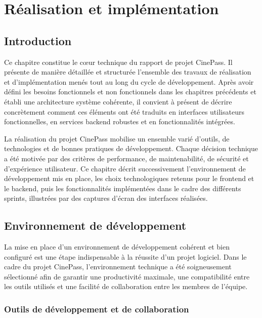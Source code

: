 \documentclass[12pt]{report}
\begin{document}
\chapter{Réalisation et implémentation}

\section{Introduction}

Ce chapitre constitue le cœur technique du rapport de projet CinePass. Il présente de manière détaillée et structurée l'ensemble des travaux de réalisation et d'implémentation menés tout au long du cycle de développement. Après avoir défini les besoins fonctionnels et non fonctionnels dans les chapitres précédents et établi une architecture système cohérente, il convient à présent de décrire concrètement comment ces éléments ont été traduits en interfaces utilisateurs fonctionnelles, en services backend robustes et en fonctionnalités intégrées.

La réalisation du projet CinePass mobilise un ensemble varié d'outils, de technologies et de bonnes pratiques de développement. Chaque décision technique a été motivée par des critères de performance, de maintenabilité, de sécurité et d'expérience utilisateur. Ce chapitre décrit successivement l'environnement de développement mis en place, les choix technologiques retenus pour le frontend et le backend, puis les fonctionnalités implémentées dans le cadre des différents sprints, illustrées par des captures d'écran des interfaces réalisées.

\section{Environnement de développement}

La mise en place d'un environnement de développement cohérent et bien configuré est une étape indispensable à la réussite d'un projet logiciel. Dans le cadre du projet CinePass, l'environnement technique a été soigneusement sélectionné afin de garantir une productivité maximale, une compatibilité entre les outils utilisés et une facilité de collaboration entre les membres de l'équipe.

\subsection{Outils de développement et de collaboration}
\end{document}
